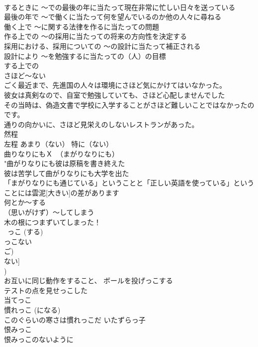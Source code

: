 \documentclass[8pt]{extreport}
\begin{document}
\begin{CJK}{UTF8}{min}
\\	するときに ～での最後の年に当たって現在非常に忙しい日々を送っている 
\\	最後の年で ～で働くに当たって何を望んでいるのか他の人々に尋ねる 
\\	働く上で ～に関する法律を作るに当たっての問題 
\\	作る上での ～の採用に当たっての将来の方向性を決定する 
\\	採用における、採用についての ～の設計に当たって補正される 
\\	設計により ～を勉強するに当たっての（人）の目標 
\\	する上での
\\	さほど～ない	
\\	ごく最近まで、先進国の人々は環境にさほど気にかけてはいなかった。 
\\	彼女は真剣なので、自室で勉強していても、さほど心配しませんでした 
\\	その当時は、偽造文書で学校に入学することがさほど難しいことではなかったのです。 
\\	通りの向かいに、さほど見栄えのしないレストランがあった。 
\\	然程 
\\	左程	あまり（ない） 特に（ない）
\\	曲りなりにもＸ　（まがりなりにも）	
\\	"曲がりなりにも彼は原稿を書き終えた 
\\	彼は苦学して曲がりなりにも大学を出た 
\\	「まがりなりにも通じている」ということと「正しい英語を使っている」ということには雲泥[大きい]の差があります 
\\	何とか～する 
\\	（思いがけず）～してしまう　
\\	木の根につまずいてしまった！
\\	~っこ (する) 
\\	っこない	
\\	ご) 
\\	ない] 
\\	[子]) 
\\	お互いに同じ動作をすること、 ボールを投げっこする 
\\	テストの点を見せっこした 
\\	当てっこ 
\\	慣れっこ (になる) 
\\	このぐらいの寒さは慣れっこだ いたずらっ子　
\\	恨みっこ　
\\	恨みっこのないように 

\end{CJK}
\end{document}
